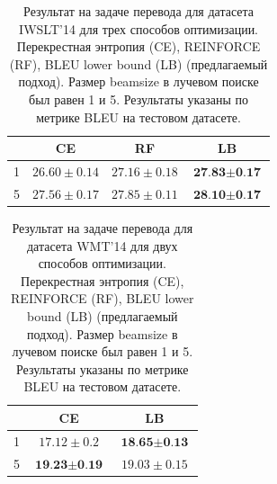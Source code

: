 \documentclass[14pt, a4paper]{extarticle}
\begin{document}
\begin{table}[t!]
\begin{center}
\begin{tabular}{|l|ccc|}
\hline \bf & \bf CE & \bf RF & \bf LB \\ \hline
1&$26.60\pm 0.14$&$27.16\pm 0.18$&$\textbf{27.83}\pm\textbf{0.17}$\\
5&$27.56\pm 0.17$&$27.85\pm 0.11$&$\textbf{28.10}\pm\textbf{0.17}$\\
\hline
\end{tabular}
\end{center}
\caption{\label{results_translation_IWSLT} Результат на задаче перевода для датасета IWSLT'14 для трех способов оптимизации. Перекрестная энтропия (CE), REINFORCE (RF), BLEU lower bound (LB) (предлагаемый подход). Размер beamsize в лучевом поиске был равен 1 и 5. Результаты указаны по метрике BLEU на тестовом датасете.}
\end{table}

\begin{table}[t!]
  \begin{center}
  \begin{tabular}{|l|cc|}
  \hline \bf & \bf CE & \bf LB \\ \hline
  1&$17.12\pm 0.2$&$\textbf{18.65}\pm\textbf{0.13}$\\
  5&$\textbf{19.23}\pm \textbf{0.19}$&$19.03\pm 0.15$\\
  \hline
  \end{tabular}
  \end{center}
  \caption{\label{results_translation_WMT} Результат на задаче перевода для датасета WMT'14 для двух способов оптимизации. Перекрестная энтропия (CE), REINFORCE (RF), BLEU lower bound (LB) (предлагаемый подход). Размер beamsize в лучевом поиске был равен 1 и 5. Результаты указаны по метрике BLEU на тестовом датасете.}
  \end{table}
  
  
\end{document}
